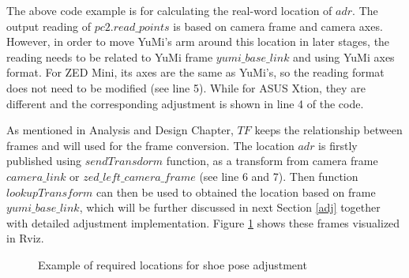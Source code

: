 The above code example is for calculating the real-word location of $adr$. The output reading of $pc2.read\_points$ is based on camera frame and camera axes. However, in order to move YuMi's arm around this location in later stages, the reading needs to be related to YuMi frame $yumi\_base\_link$ and using YuMi axes format. For ZED Mini, its axes are the same as YuMi's, so the reading format does not need to be modified (see line 5). While for ASUS Xtion, they are different and the corresponding adjustment is shown in line 4 of the code. 

As mentioned in Analysis and Design Chapter, $TF$ keeps the relationship between frames and will used for the frame conversion. The location $adr$ is firstly published using $sendTransdorm$ function, as a transform from camera frame $camera\_link$ or $zed\_left\_camera\_frame$ (see line 6 and 7). Then function $lookupTransform$ can then be used to obtained the location based on frame $yumi\_base\_link$, which will be further discussed in next Section \ref{adj} together with detailed adjustment implementation. Figure \ref{3dadj} shows these frames visualized in Rviz.

\begin{figure}[H]
\centering
{}
\caption{Example of required locations for shoe pose adjustment}
\label{3dadj}
\end{figure}


